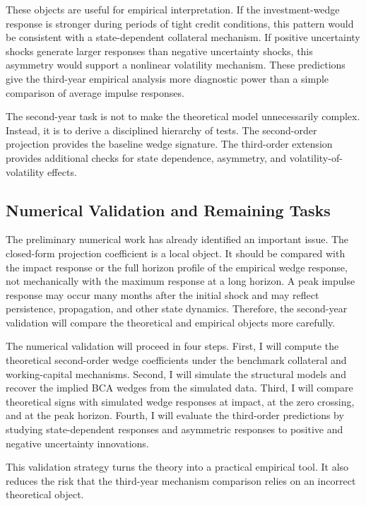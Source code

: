 \documentclass[12pt]{article}
\begin{document}
These objects are useful for empirical interpretation. If the investment-wedge response is stronger
during periods of tight credit conditions, this pattern would be consistent with a state-dependent
collateral mechanism. If positive uncertainty shocks generate larger responses than negative
uncertainty shocks, this asymmetry would support a nonlinear volatility mechanism. These
predictions give the third-year empirical analysis more diagnostic power than a simple comparison
of average impulse responses.

The second-year task is not to make the theoretical model unnecessarily complex. Instead, it is to
derive a disciplined hierarchy of tests. The second-order projection provides the baseline wedge
signature. The third-order extension provides additional checks for state dependence, asymmetry,
and volatility-of-volatility effects.

\subsection{Numerical Validation and Remaining Tasks}

The preliminary numerical work has already identified an important issue. The closed-form
projection coefficient is a local object. It should be compared with the impact response or the
full horizon profile of the empirical wedge response, not mechanically with the maximum response
at a long horizon. A peak impulse response may occur many months after the
initial shock and may reflect persistence, propagation, and other state dynamics. Therefore, the
second-year validation will compare the theoretical and empirical objects more carefully.

The numerical validation will proceed in four steps. First, I will compute the theoretical
second-order wedge coefficients under the benchmark collateral and working-capital mechanisms.
Second, I will simulate the structural models and recover the implied BCA wedges from the
simulated data. Third, I will compare theoretical signs with simulated wedge responses at impact,
at the zero crossing, and at the peak horizon. Fourth, I will evaluate the third-order predictions
by studying state-dependent responses and asymmetric responses to positive and negative
uncertainty innovations.

This validation strategy turns the theory into a practical empirical tool. It also reduces the risk
that the third-year mechanism comparison relies on an incorrect theoretical object.
\end{document}
